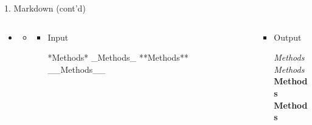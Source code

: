 \documentclass[14pt, aspectratio=169, sectionpage=simple, xclolor=table]{beamer}
\begin{document}
\begin{frame}[fragile, t]{1. Markdown (cont'd)}
\begin{itemize}
	\item {}
	\begin{itemize}
		\item[] 
		
		
		\begin{columns}
			\begin{column}{0.45\textwidth}
				\vspace{1cm}
				\begin{itemize}
					\item Input
					
					\begin{code11}
						*Methods*  
						_Methods_
						**Methods**
						__Methods__
					\end{code11}
				\end{itemize}
			\end{column}%
			\hfill
			\begin{column}{0.45\textwidth}
				\vspace{1cm}
				\begin{itemize}
					\item Output
					
					\textit{Methods}
					\\
					\textit{Methods}
					\\
					\textbf{Methods}
					\\
					\textbf{Methods}
					\\  
				\end{itemize}
			\end{column}%
		\end{columns}
	\end{itemize}
\end{itemize}

\end{frame}
\end{document}
